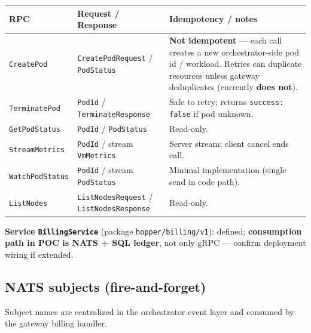 \documentclass[12pt,a4paper]{article}
\begin{document}
\begin{tabularx}{\textwidth}{@{}L{3.2cm} X X@{}}
  \toprule
  \textbf{RPC} & \textbf{Request / Response} & \textbf{Idempotency / notes} \\
  \midrule
  \texttt{CreatePod} & \texttt{CreatePodRequest} / \texttt{PodStatus} & \textbf{Not idempotent} --- each call creates a new orchestrator-side pod id / workload. Retries can duplicate resources unless gateway deduplicates (currently \textbf{does not}). \\
  \texttt{TerminatePod} & \texttt{PodId} / \texttt{TerminateResponse} & Safe to retry; returns \texttt{success: false} if pod unknown. \\
  \texttt{GetPodStatus} & \texttt{PodId} / \texttt{PodStatus} & Read-only. \\
  \texttt{StreamMetrics} & \texttt{PodId} / stream \texttt{VmMetrics} & Server stream; client cancel ends call. \\
  \texttt{WatchPodStatus} & \texttt{PodId} / stream \texttt{PodStatus} & Minimal implementation (single send in code path). \\
  \texttt{ListNodes} & \texttt{ListNodesRequest} / \texttt{ListNodesResponse} & Read-only. \\
  \bottomrule
\end{tabularx}

\vspace{0.5em}
\noindent\textbf{Service \texttt{BillingService}} (package \texttt{hopper/billing/v1}): defined; \textbf{consumption path in POC is NATS + SQL ledger}, not only gRPC --- confirm deployment wiring if extended.

\subsection{NATS subjects (fire-and-forget)}
Subject names are centralized in the orchestrator event layer and consumed by the gateway billing handler.
\end{document}
